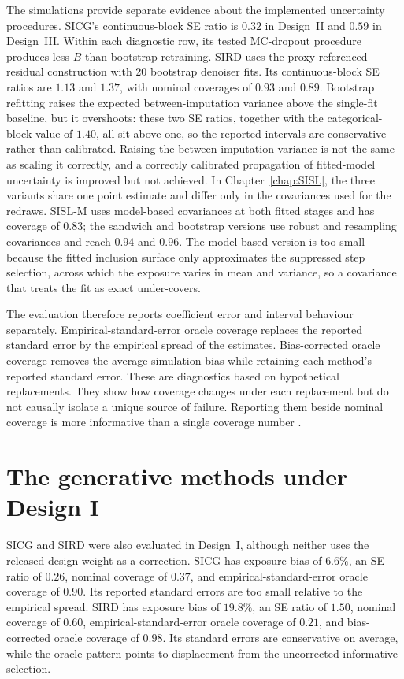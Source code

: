 The simulations provide separate evidence about the implemented uncertainty procedures. SICG's continuous-block SE ratio is $0.32$ in Design~II and $0.59$ in Design~III. Within each diagnostic row, its tested MC-dropout procedure produces less $B$ than bootstrap retraining. SIRD uses the proxy-referenced residual construction with 20 bootstrap denoiser fits. Its continuous-block SE ratios are $1.13$ and $1.37$, with nominal coverages of $0.93$ and $0.89$. Bootstrap refitting raises the expected between-imputation variance above the single-fit baseline, but it overshoots: these two SE ratios, together with the categorical-block value of $1.40$, all sit above one, so the reported intervals are conservative rather than calibrated. Raising the between-imputation variance is not the same as scaling it correctly, and a correctly calibrated propagation of fitted-model uncertainty is improved but not achieved. In Chapter~\ref{chap:SISL}, the three variants share one point estimate and differ only in the covariances used for the redraws. SISL-M uses model-based covariances at both fitted stages and has coverage of $0.83$; the sandwich and bootstrap versions use robust and resampling covariances and reach $0.94$ and $0.96$. The model-based version is too small because the fitted inclusion surface only approximates the suppressed step selection, across which the exposure varies in mean and variance, so a covariance that treats the fit as exact under-covers.

The evaluation therefore reports coefficient error and interval behaviour separately. Empirical-standard-error oracle coverage replaces the reported standard error by the empirical spread of the estimates. Bias-corrected oracle coverage removes the average simulation bias while retaining each method's reported standard error. These are diagnostics based on hypothetical replacements. They show how coverage changes under each replacement but do not causally isolate a unique source of failure. Reporting them beside nominal coverage is more informative than a single coverage number \citep{morris2019using}.

\section{The generative methods under Design I}
\label{sec:conc_designI}

SICG and SIRD were also evaluated in Design~I, although neither uses the released design weight as a correction. SICG has exposure bias of $6.6\%$, an SE ratio of $0.26$, nominal coverage of $0.37$, and empirical-standard-error oracle coverage of $0.90$. Its reported standard errors are too small relative to the empirical spread. SIRD has exposure bias of $19.8\%$, an SE ratio of $1.50$, nominal coverage of $0.60$, empirical-standard-error oracle coverage of $0.21$, and bias-corrected oracle coverage of $0.98$. Its standard errors are conservative on average, while the oracle pattern points to displacement from the uncorrected informative selection.

